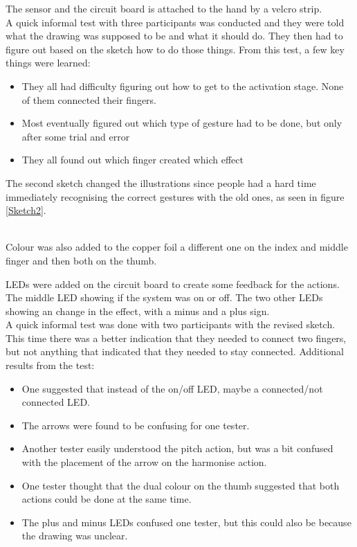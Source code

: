 The sensor and the circuit board is attached to the hand by a velcro strip. \\

A quick informal test with three participants was conducted and they were told what the drawing was supposed to be and what it should do. They then had to figure out based on the sketch how to do those things.
From this test, a few key things were learned:
 
\begin{itemize}
	\item They all had difficulty figuring out how to get to the activation stage. None of them connected their fingers.
	\item Most eventually figured out which type of gesture had to be done, but only after some trial and error
	\item They all found out which finger created which effect
\end{itemize}

The second sketch changed the illustrations since people had a hard time immediately recognising the correct gestures with the old ones, as seen in figure \ref{Sketch2}.\\

\begin{minipage}{\linewidth}%
\label{Sketch2}
\end{minipage}\\

Colour was also added to the copper foil a different one on the index and middle finger and then both on the thumb.

LEDs were added on the circuit board to create some feedback for the actions. The middle LED showing if the system was on or off. The two other LEDs showing an change in the effect, with a minus and a plus sign.\\

A quick informal test was done with two participants with the revised sketch. This time there was a better indication that they needed to connect two fingers, but not anything that indicated that they needed to stay connected.
Additional results from the test:

\begin{itemize}
	\item One suggested that instead of the on/off LED, maybe a connected/not connected LED.
	\item The arrows were found to be confusing for one tester.
	\item Another tester easily understood the pitch action, but was a bit confused with the placement of the arrow on the harmonise action.
	\item One tester thought that the dual colour on the thumb suggested that both actions could be done at the same time.
	\item The plus and minus LEDs confused one tester, but this could also be because the drawing was unclear.
\end{itemize} 

